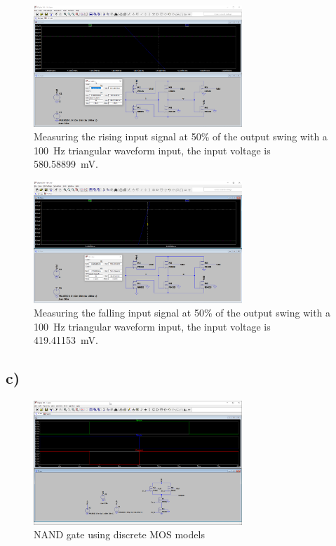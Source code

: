 \documentclass{article}
\begin{document}
	\begin{figure}[H]
	    \centering
	    \includegraphics[width=0.7\textwidth]{1b-2-2-sim}
	    \caption[Measuring the rising input signal]{Measuring the rising input signal at 50\% of the output swing with a \SI{100}{Hz} triangular waveform input, the input voltage is \SI{580.58899}{mV}.}
	\end{figure}
	
	\begin{figure}[H]
	    \centering
	    \includegraphics[width=0.7\textwidth]{1b-2-3-sim}
	    \caption[Measuring the falling input signal]{Measuring the falling input signal at 50\% of the output swing with a \SI{100}{Hz} triangular waveform input, the input voltage is \SI{419.41153}{mV}. }
	\end{figure}
	
	
	\subsection*{c)}

	\begin{figure}[H]
	    \centering
	    \includegraphics[width=0.7\textwidth]{1c-1-sim}
	    \caption{NAND gate using discrete MOS models}
	\end{figure}
	
\end{document}
